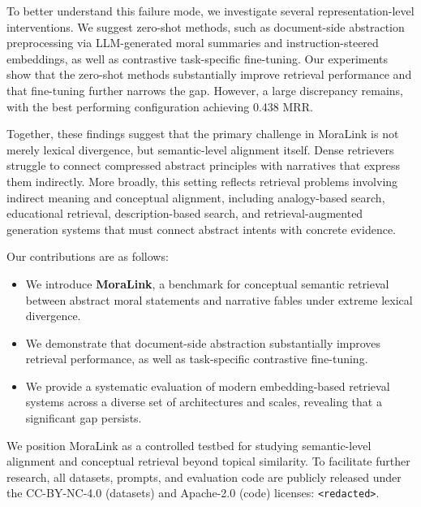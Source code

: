\documentclass[11pt]{article}
\begin{document}
To better understand this failure mode, we investigate several representation-level interventions.
We suggest zero-shot methods, such as document-side abstraction preprocessing via LLM-generated moral summaries and instruction-steered embeddings, as well as contrastive task-specific fine-tuning.
Our experiments show that the zero-shot methods substantially improve retrieval performance and that fine-tuning further narrows the gap.
However, a large discrepancy remains, with the best performing configuration achieving 0.438 MRR.

Together, these findings suggest that the primary challenge in MoraLink is not merely lexical divergence, but semantic-level alignment itself.
Dense retrievers struggle to connect compressed abstract principles with narratives that express them indirectly.
More broadly, this setting reflects retrieval problems involving indirect meaning and conceptual alignment, including analogy-based search, educational retrieval, description-based search, and retrieval-augmented generation systems that must connect abstract intents with concrete evidence.

Our contributions are as follows:

\begin{itemize}
    \item We introduce \textbf{MoraLink}, a benchmark for conceptual semantic retrieval between abstract moral statements and narrative fables under extreme lexical divergence.
    \item We demonstrate that document-side abstraction substantially improves retrieval performance, as well as task-specific contrastive fine-tuning.
    \item We provide a systematic evaluation of modern embedding-based retrieval systems across a diverse set of architectures and scales, revealing that a significant gap persists.
    
\end{itemize}

We position MoraLink as a controlled testbed for studying semantic-level alignment and conceptual retrieval beyond topical similarity. 
To facilitate further research, all datasets, prompts, and evaluation code are publicly released under the CC-BY-NC-4.0 (datasets) and Apache-2.0 (code) licenses: \texttt{<redacted>}.

\end{document}
